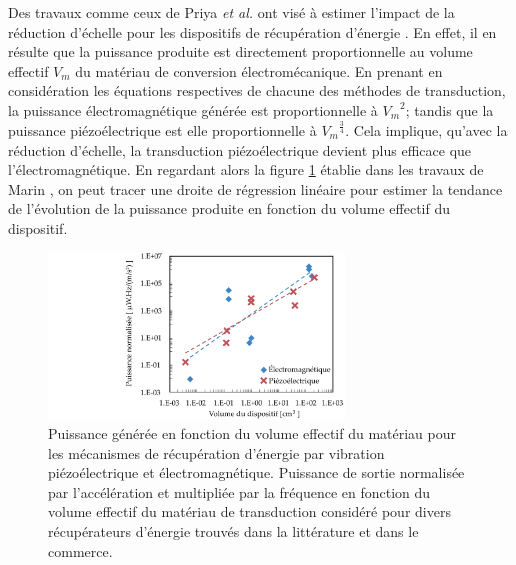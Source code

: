 Des travaux comme ceux de Priya \emph{et al.} ont visé à estimer l'impact de la réduction d'échelle pour les dispositifs de récupération d'énergie \cite{Marin2011}. En effet, il en résulte que la puissance produite est directement proportionnelle au volume effectif $V_m$ du matériau de conversion électromécanique. En prenant en considération les équations respectives de chacune des méthodes de transduction, la puissance électromagnétique générée est proportionnelle à ${V_m}^2$; tandis que la puissance piézoélectrique est elle proportionnelle à ${V_m}^{\frac{3}{4}}$. Cela implique, qu'avec la réduction d'échelle, la transduction piézoélectrique devient plus efficace que l'électromagnétique. En regardant alors la figure \ref{fig:puissance-volume} établie dans les travaux de Marin \cite{Marin2011}, on peut tracer une droite de régression linéaire pour estimer la tendance de l'évolution de la puissance produite en fonction du volume effectif du dispositif.
\begin{figure}[!htbp]
\begin{center}
    \captionsetup{justification=centering}
	\includegraphics[trim={8cm 0cm 0cm 0cm},clip,width=0.7\textwidth]{../Chap2/Figure/puissance-volume.pdf}
	\caption{Puissance générée en fonction du volume effectif du matériau pour les mécanismes de récupération d'énergie par vibration piézoélectrique et électromagnétique. Puissance de sortie normalisée par l'accélération et multipliée par la fréquence en fonction du volume effectif du matériau de transduction considéré pour divers récupérateurs d'énergie trouvés dans la littérature et dans le commerce. \cite{Priya2017}}
	\label{fig:puissance-volume}
\end{center}
\end{figure}

